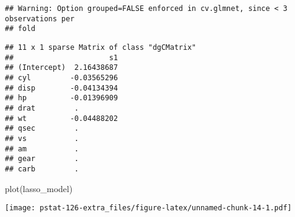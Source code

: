 \documentclass[
]{article}
\newenvironment{Shaded}{\begin{snugshade}}{\end{snugshade}}
\newcommand{\AttributeTok}[1]{\textcolor[rgb]{0.77,0.63,0.00}{#1}}
\newcommand{\DecValTok}[1]{\textcolor[rgb]{0.00,0.00,0.81}{#1}}
\newcommand{\FunctionTok}[1]{\textcolor[rgb]{0.00,0.00,0.00}{#1}}
\newcommand{\NormalTok}[1]{#1}
\newcommand{\OtherTok}[1]{\textcolor[rgb]{0.56,0.35,0.01}{#1}}
\newcommand{\SpecialCharTok}[1]{\textcolor[rgb]{0.00,0.00,0.00}{#1}}
\newcommand{\StringTok}[1]{\textcolor[rgb]{0.31,0.60,0.02}{#1}}
\begin{document}
\begin{verbatim}
## Warning: Option grouped=FALSE enforced in cv.glmnet, since < 3 observations per
## fold
\end{verbatim}

\begin{Shaded}
\end{Shaded}

\begin{verbatim}
## 11 x 1 sparse Matrix of class "dgCMatrix"
##                      s1
## (Intercept)  2.16438687
## cyl         -0.03565296
## disp        -0.04134394
## hp          -0.01396909
## drat         .         
## wt          -0.04488202
## qsec         .         
## vs           .         
## am           .         
## gear         .         
## carb         .
\end{verbatim}

\begin{Shaded}
\begin{Highlighting}[]
\FunctionTok{plot}\NormalTok{(lasso\_model)}
\end{Highlighting}
\end{Shaded}

\texttt{[image: pstat-126-extra\_files/figure-latex/unnamed-chunk-14-1.pdf]}

\begin{Shaded}
\end{Shaded}
\end{document}
